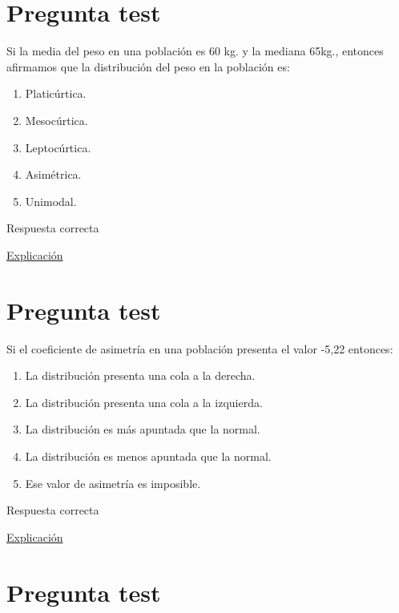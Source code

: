 \documentclass[
]{book}
\providecommand{\tightlist}{%
  \setlength{\itemsep}{0pt}\setlength{\parskip}{0pt}}
\begin{document}
\hypertarget{pregunta-test-51}{%
\section{Pregunta test}\label{pregunta-test-51}}

Si la media del peso en una población es 60 kg. y la mediana 65kg., entonces afirmamos que la distribución del peso en la población es:

\begin{enumerate}
\def\labelenumi{\alph{enumi})}
\tightlist
\item
  Platicúrtica.
\item
  Mesocúrtica.
\item
  Leptocúrtica.
\item
  Asimétrica.
\item
  Unimodal.
\end{enumerate}

Respuesta correcta

\href{https://1fjmanzano.github.io/bioestadistica/medidas-de-forma.html}{Explicación}

\hypertarget{pregunta-test-52}{%
\section{Pregunta test}\label{pregunta-test-52}}

Si el coeficiente de asimetría en una población presenta el valor -5,22 entonces:

\begin{enumerate}
\def\labelenumi{\alph{enumi})}
\tightlist
\item
  La distribución presenta una cola a la derecha.
\item
  La distribución presenta una cola a la izquierda.
\item
  La distribución es más apuntada que la normal.
\item
  La distribución es menos apuntada que la normal.
\item
  Ese valor de asimetría es imposible.
\end{enumerate}

Respuesta correcta

\href{https://1fjmanzano.github.io/bioestadistica/medidas-de-forma.html}{Explicación}

\hypertarget{pregunta-test-53}{%
\section{Pregunta test}\label{pregunta-test-53}}
\end{document}
